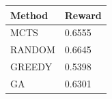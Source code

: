 \begin{tabular}{ll}
\hline
Method & Reward \\
\hline
  MCTS & 0.6555 \\
  RANDOM & 0.6645 \\
  GREEDY & 0.5398 \\
  GA & 0.6301 \\
\hline
\end{tabular}
